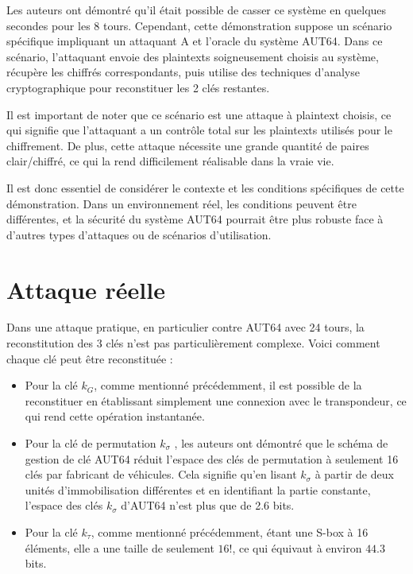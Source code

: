 \documentclass{template}
\begin{document}
Les auteurs ont démontré qu'il était possible de casser ce système en quelques secondes pour les 8 tours. Cependant, cette démonstration suppose un scénario spécifique impliquant un attaquant A et l'oracle du système AUT64. Dans ce scénario, l'attaquant envoie des plaintexts soigneusement choisis au système, récupère les chiffrés correspondants, puis utilise des techniques d'analyse cryptographique pour reconstituer les 2 clés restantes.

Il est important de noter que ce scénario est une attaque à plaintext choisis, ce qui signifie que l'attaquant a un contrôle total sur les plaintexts utilisés pour le chiffrement. De plus, cette attaque nécessite une grande quantité de paires clair/chiffré, ce qui la rend difficilement réalisable dans la vraie vie.

Il est donc essentiel de considérer le contexte et les conditions spécifiques de cette démonstration. Dans un environnement réel, les conditions peuvent être différentes, et la sécurité du système AUT64 pourrait être plus robuste face à d'autres types d'attaques ou de scénarios d'utilisation.

\section{Attaque réelle}
\baselineskip=16pt

Dans une attaque pratique, en particulier contre AUT64 avec 24 tours, la reconstitution des 3 clés n'est pas particulièrement complexe. Voici comment chaque clé peut être reconstituée :

\begin{itemize}
    \item Pour la clé $k_G$, comme mentionné précédemment, il est possible de la reconstituer en établissant simplement une connexion avec le transpondeur, ce qui rend cette opération instantanée.
    
    \item Pour la clé de permutation $k_\sigma$ , les auteurs ont démontré que le schéma de gestion de clé AUT64 réduit l'espace des clés de permutation à seulement 16 clés par fabricant de véhicules. Cela signifie qu'en lisant $k_\sigma$ à partir de deux unités d'immobilisation différentes et en identifiant la partie constante, l'espace des clés $k_\sigma$ d'AUT64 n'est plus que de 2.6 bits. 
    
    \item Pour la clé $k_\tau$, comme mentionné précédemment, étant une S-box à 16 éléments, elle a une taille de seulement $16!$, ce qui équivaut à environ $44.3$ bits.
\end{itemize}
\end{document}
